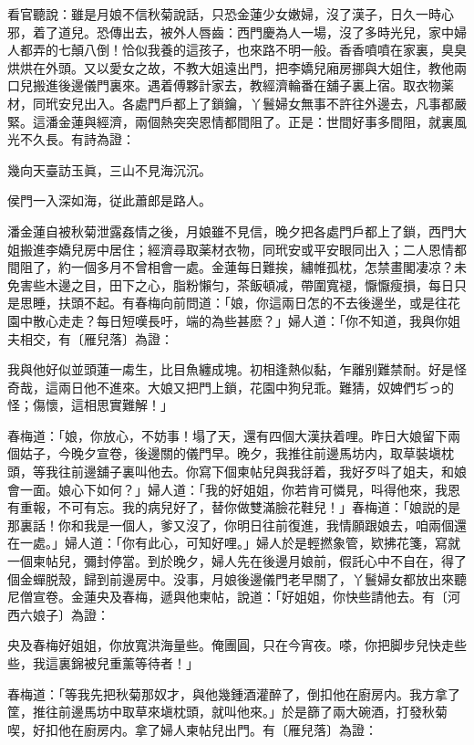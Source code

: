 看官聽說：雖是月娘不信秋菊說話，只恐金蓮少女嫩婦，沒了漢子，日久一時心邪，着了道兒。恐傳出去，被外人唇齒：西門慶為人一場，沒了多時光兒，家中婦人都弄的七顛八倒！恰似我養的這孩子，也來路不明一般。香香噴噴在家裏，臭臭烘烘在外頭。又以愛女之故，不教大姐遠出門，把李嬌兒廂房挪與大姐住，教他兩口兒搬進後邊儀門裏來。遇着傅夥計家去，教經濟輪番在舖子裏上宿。取衣物薬材，同玳安兒出入。各處門戶都上了鎖鑰，丫鬟婦女無事不許往外邊去，凡事都嚴緊。這潘金蓮與經濟，兩個熱突突恩情都間阻了。正是：世間好事多間阻，就裏風光不久長。有詩為證：

\begin{myquote}
幾向天臺訪玉眞，三山不見海沉沉。

侯門一入深如海，従此蕭郎是路人。
\end{myquote}

潘金蓮自被秋菊泄露姦情之後，月娘雖不見信，晚夕把各處門戶都上了鎖，西門大姐搬進李嬌兒房中居住；經濟尋取薬材衣物，同玳安或平安眼同出入；二人恩情都間阻了，約一個多月不曾相會一處。金蓮每日難挨，繡帷孤枕，怎禁畫閣凄凉？未免害些木邊之目，田下之心，脂粉懶匀，茶飯頓减，帶圍寬褪，懨懨瘦損，每日只是思睡，扶頭不起。有春梅向前問道：「娘，你這兩日怎的不去後邊坐，或是往花園中散心走走？每日短嘆長吁，端的為些甚麽？」婦人道：「你不知道，我與你姐夫相交，有〔雁兒落〕為證：

\begin{myquote}
我與他好似並頭蓮一䖏生，比目魚纏成塊。初相逢熱似黏，乍離别難禁耐。好是怪奇哉，這兩日他不進來。大娘又把門上鎖，花園中狗兒乖。難猜，奴婢們ぢっ的怪；傷懷，這相思實難解！」
\end{myquote}

春梅道：「娘，你放心，不妨事！塌了天，還有四個大漢扶着哩。昨日大娘留下兩個姑子，今晚夕宣卷，後邊關的儀門早。晚夕，我推往前邊馬坊内，取草裝塡枕頭，等我往前邊舖子裏叫他去。你寫下個柬帖兒與我㧱着，我好歹呌了姐夫，和娘會一面。娘心下如何？」婦人道：「我的好姐姐，你若肯可憐見，呌得他來，我恩有重報，不可有忘。我的病兒好了，替你做雙滿臉花鞋兒！」春梅道：「娘説的是那裏話！你和我是一個人，爹又沒了，你明日往前復進，我情願跟娘去，咱兩個還在一處。」婦人道：「你有此心，可知好哩。」婦人於是輕撚象管，欵拂花箋，寫就一個柬帖兒，彌封停當。到於晚夕，婦人先在後邊月娘前，假託心中不自在，得了個金蟬脱殼，歸到前邊房中。没事，月娘後邊儀門老早關了，丫鬟婦女都放出來聽尼僧宣卷。金蓮央及春梅，遞與他柬帖，說道：「好姐姐，你快些請他去。有〔河西六娘子〕為證：

央及春梅好姐姐，你放寬洪海量些。俺團圓，只在今宵夜。嗏，你把脚步兒快走些些，我這裏錦被兒重薰等待者！」

春梅道：「等我先把秋菊那奴才，與他幾鍾酒灌醉了，倒扣他在廚房内。我方拿了筐，推往前邊馬坊中取草來塡枕頭，就叫他來。」於是篩了兩大碗酒，打發秋菊喫，好扣他在廚房内。拿了婦人柬帖兒出門。有〔雁兒落〕為證：

